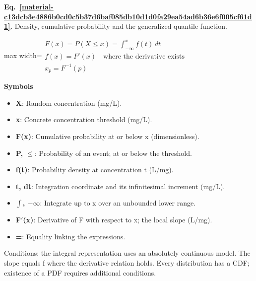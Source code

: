 \documentclass[11pt,a4paper]{article}
\begin{document}
\par\medskip
\begin{samepage}
\label{material-c13dcb3e4886b0cd0c5b37d6baf085db10d1d0fa29ea54ad6b36e6f005cf61d1}
\noindent\textbf{Eq.~\ref*{material-c13dcb3e4886b0cd0c5b37d6baf085db10d1d0fa29ea54ad6b36e6f005cf61d1}.} Density, cumulative probability and the generalized quantile function.\par\nopagebreak
\begin{center}\begin{adjustbox}{max width=\linewidth}$\displaystyle \begin{gathered}F(x)=P(X\le x)=\int_{-\infty}^{x}f(t)\,dt\\f(x)=F'(x)\quad\text{where the derivative exists}\\x_p=F^{-1}(p)\end{gathered}$\end{adjustbox}\end{center}

\par\noindent\textbf{Symbols}

\begin{itemize}\setlength{\itemsep}{1pt}\setlength{\parsep}{0pt}
\item \textbf{X}: Random concentration (mg/L).
\item \textbf{x}: Concrete concentration threshold (mg/L).
\item \textbf{F(x)}: Cumulative probability at or below x (dimensionless).
\item \textbf{P, \ensuremath{\le}}: Probability of an event; at or below the threshold.
\item \textbf{f(t)}: Probability density at concentration t (L/mg).
\item \textbf{t, dt}: Integration coordinate and its infinitesimal increment (mg/L).
\item \textbf{\ensuremath{\int}, \ensuremath{-}\ensuremath{\infty}}: Integrate up to x over an unbounded lower range.
\item \textbf{F\ensuremath{\prime}(x)}: Derivative of F with respect to x; the local slope (L/mg).
\item \textbf{=}: Equality linking the expressions.
\end{itemize}

Conditions: the integral representation uses an absolutely continuous model. The slope equals f where the derivative relation holds. Every distribution has a CDF; existence of a PDF requires additional conditions.


\end{samepage}
\end{document}
